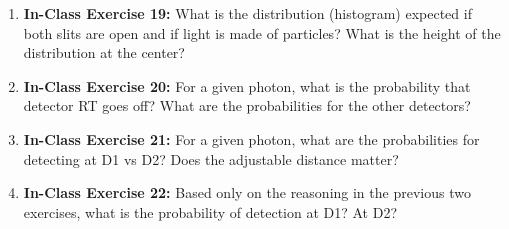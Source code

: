 \documentclass[main.tex]{subfiles}
\begin{document}
\begin{enumerate}
\item[] \textbf{In-Class Exercise 19:} What is the distribution (histogram) expected if both slits are open and if light is made of particles? What is the height of the distribution at the center?

\item[] \textbf{In-Class Exercise 20:} For a given photon, what is the probability that detector RT goes off? What are the probabilities for the other detectors?

\item[] \textbf{In-Class Exercise 21:} For a given photon, what are the probabilities for detecting at D1 vs D2? Does the adjustable distance matter?

\item[] \textbf{In-Class Exercise 22:} Based only on the reasoning in the previous two exercises, what is the probability of detection at D1? At D2?

\end{enumerate}
\end{document}
